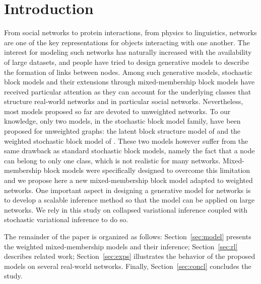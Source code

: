 \section{Introduction}

From social networks to protein interactions, from physics to linguistics, networks are one of the key representations for objects interacting with one another. The interest for modeling such networks has naturally increased with the availability of large datasets, and people have tried to design generative models to describe the formation of links between nodes. Among such generative models, stochastic block models and their extensions through mixed-membership block models have received particular attention \cite{airoldi2009mixed,iMMSB,fan2015dynamic} as they can account for the underlying classes that structure real-world networks and in particular social networks. Nevertheless, most models proposed so far are devoted to unweighted networks. To our knowledge, only two models, in the stochastic block model family, have been proposed for unweighted graphs: the latent block structure model of \cite{aicher2014learning} and the weighted stochastic block model of \cite{peixoto2018nonparametric}. These two models however suffer from the same drawback as standard stochastic block models, namely the fact that a node can belong to only one class, which is not realistic for many networks. Mixed-membership block models were specifically designed to overcome this limitation and we propose here a new mixed-membership block model adapted to weighted networks. One important aspect in designing a generative model for networks is to develop a scalable inference method so that the model can be applied on large networks. We rely in this study on collapsed variational inference coupled with stochastic variational inference to do so.

The remainder of the paper is organized as follows: Section~\ref{sec:model} presents the weighted mixed-membership models and their inference; Section~\ref{sec:rl} describes related work; Section~\ref{sec:exps} illustrates the behavior of the proposed models on several real-world networks. Finally, Section~\ref{sec:concl} concludes the study.


